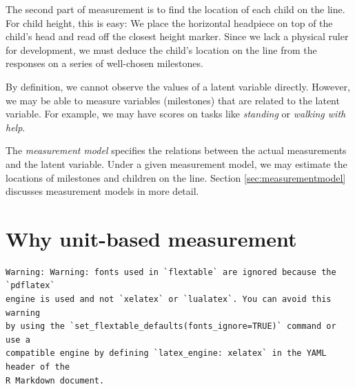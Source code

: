 \documentclass[
]{book}
\begin{document}
The second part of measurement is to find the location of each child on the line. For child height, this is easy: We place the horizontal headpiece on top of the child's head and read off the closest height marker. Since we lack a physical ruler for development, we must deduce the child's location on the line from the responses on a series of well-chosen milestones.

By definition, we cannot observe the values of a latent variable directly. However, we may be able to measure variables (milestones) that are related to the latent variable. For example, we may have scores on tasks like \emph{standing} or \emph{walking with help}.

The \emph{measurement model} specifies the relations between the actual measurements and the latent variable. Under a given measurement model, we may estimate the locations of milestones and children on the line. Section \ref{sec:measurementmodel} discusses measurement models in more detail.

\hypertarget{sec:whyunit}{%
\section{Why unit-based measurement}\label{sec:whyunit}}

\begin{verbatim}
Warning: Warning: fonts used in `flextable` are ignored because the `pdflatex`
engine is used and not `xelatex` or `lualatex`. You can avoid this warning
by using the `set_flextable_defaults(fonts_ignore=TRUE)` command or use a
compatible engine by defining `latex_engine: xelatex` in the YAML header of the
R Markdown document.
\end{verbatim}

\providecommand{\docline}[3]{\noalign{\global\setlength{\arrayrulewidth}{#1}}\arrayrulecolor[HTML]{#2}\cline{#3}}

\setlength{\tabcolsep}{2pt}

\renewcommand*{\arraystretch}{1.5}
\end{document}
